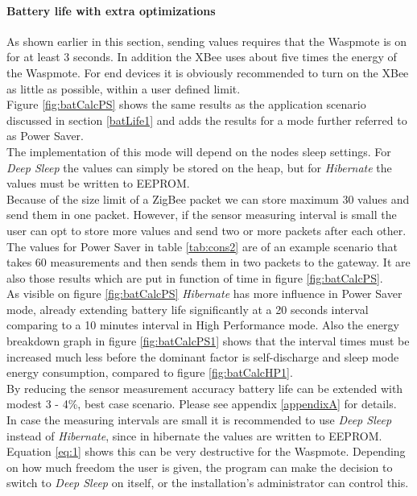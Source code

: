 \paragraph{Battery life with extra optimizations}
\label{powerSaver}
As shown earlier in this section, sending values requires that the Waspmote is on for at least 3 seconds. In addition the XBee uses about five times the energy of the Waspmote. For end devices it is obviously recommended to turn on the XBee as little as possible, within a user defined limit.\\ Figure \ref{fig:batCalcPS} shows the same results as the application scenario discussed in section \ref{batLife1} and adds the results for a mode further referred to as Power Saver.\\
The implementation of this mode will depend on the nodes sleep settings. For \textit{Deep Sleep} the values can simply be stored on the heap, but for \textit{Hibernate} the values must be written to EEPROM.\\
Because of the size limit of a ZigBee packet we can store maximum 30 values and send them in one packet. However, if the sensor measuring interval is small the user can opt to store more values and send two or more packets after each other. The values for Power Saver in table \ref{tab:cons2} are of an example scenario that takes 60 measurements and then sends them in two packets to the gateway. It are also those results which are put in function of time in figure \ref{fig:batCalcPS}.\\
As visible on figure \ref{fig:batCalcPS} \textit{Hibernate} has more influence in Power Saver mode, already extending battery life significantly at a 20 seconds interval comparing to a 10 minutes interval in High Performance mode. Also the energy breakdown graph in figure \ref{fig:batCalcPS1} shows that the interval times must be increased much less before the dominant factor is self-discharge and sleep mode energy consumption, compared to figure \ref{fig:batCalcHP1}.\\By reducing the sensor measurement accuracy battery life can be extended with modest 3 - 4\%, best case scenario. Please see appendix \ref{appendixA} for details.\\
In case the measuring intervals are small it is recommended to use \textit{Deep Sleep} instead of \textit{Hibernate}, since in hibernate the values are written to EEPROM. Equation \ref{eq:1} shows this can be very destructive for the Waspmote. Depending on how much freedom the user is given, the program can make the decision to switch to \textit{Deep Sleep} on itself, or the installation's administrator can control this.
